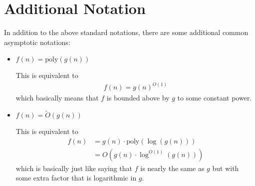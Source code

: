\documentclass[10pt,a4paper]{article}
\begin{document}
\section*{Additional Notation}

In addition to the above standard notations, there are some additional common asymptotic notations:
\begin{itemize}
    \item $f(n) = \text{poly}(g(n))$
    
    This is equivalent to
    \begin{align*}
        f(n) = g(n)^{O(1)}
    \end{align*}
    which basically means that $f$ is bounded above by $g$ to some constant power.

    \item $f(n) = \tilde{O}(g(n))$
    
    This is equivalent to
    \begin{align*}
        f(n) &= g(n) \cdot \text{poly}(\log(g(n))) \\
        &= O(g(n) \cdot \log^ {O(1)}(g(n)) )
    \end{align*}
    which is basically just like saying that $f$ is nearly the same as $g$ but with some extra factor that is logarithmic in $g$.

\end{itemize}
\end{document}
